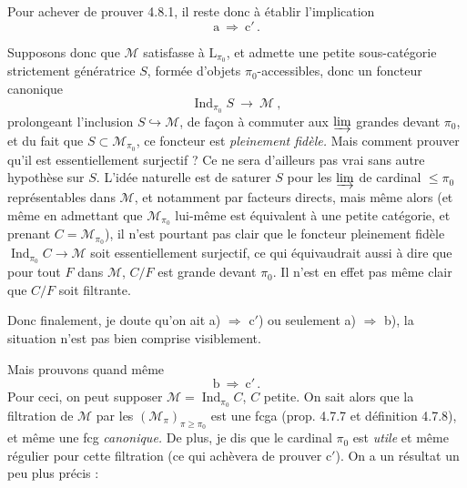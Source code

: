 \documentclass[11pt]{article}
\newcommand{\printedpage}[1]{\marginpar{\footnotesize p.~#1}}
\newcommand{\msp}[1]{\marginpar{\footnotesize [#1]}}
\newcommand{\Ind}{\operatorname{Ind}}
\begin{document}
Pour achever de prouver 4.8.1, il reste donc à établir l'implication
\[
\mathrm{a} \ \Longrightarrow \ \mathrm{c}' \, .
\]

\printedpage{70}

Supposons donc que $\mathcal{M}$ satisfasse à $\mathrm{L}_{\pi_0}$, et admette une petite sous-catégorie strictement génératrice $S$, formée d'objets $\pi_0$-accessibles, donc un foncteur canonique
\[
\Ind_{\pi_0}S \ \longrightarrow \ \mathcal{M} \ ,
\]
prolongeant l'inclusion $S\hookrightarrow\mathcal{M}$, de façon à commuter aux $\varinjlim$ grandes devant $\pi_0$, et du fait que $S\subset\mathcal{M}_{\pi_0}$, ce foncteur est \textit{pleinement fidèle.} Mais comment prouver qu'il est essentiellement surjectif ? Ce ne sera d'ailleurs pas vrai sans autre hypothèse sur $S$. L'idée naturelle est de saturer $S$ pour les $\varinjlim$
\msp{page 200}
de cardinal $\leqslant\pi_0$ représentables dans $\mathcal{M}$, et notamment par facteurs directs, mais même alors (et même en admettant que $\mathcal{M}_{\pi_0}$ lui-même est équivalent à une petite catégorie, et prenant $C=\mathcal{M}_{\pi_0}$), il n'est pourtant pas clair que le foncteur pleinement fidèle $\Ind_{\pi_0}C\longrightarrow\mathcal{M}$ soit essentiellement surjectif, ce qui équivaudrait aussi à dire que pour tout $F$ dans $\mathcal{M}$, $C/F$ est grande devant $\pi_0$. Il n'est en effet pas même clair que $C/F$ soit filtrante.

Donc finalement, je doute qu'on ait a) $\Longrightarrow$ c$'$) ou seulement a) $\Longrightarrow$ b), la situation n'est pas bien comprise visiblement.

Mais prouvons quand même
\[
\mathrm{b} \ \Longrightarrow \ \mathrm{c}' \, .
\]
Pour ceci, on peut supposer $\mathcal{M}=\Ind_{\pi_0}C$, $C$ petite. On sait alors que la filtration de $\mathcal{M}$ par les $(\mathcal{M}_\pi)_{\pi\geqslant\pi_0}$ est une fcga (prop. 4.7.7 et définition 4.7.8), et même une fcg \textit{canonique.} De plus, je dis que le cardinal $\pi_0$ est \textit{utile} et même régulier pour cette filtration (ce qui achèvera de prouver c$'$). On a un résultat un peu plus précis :
\end{document}
